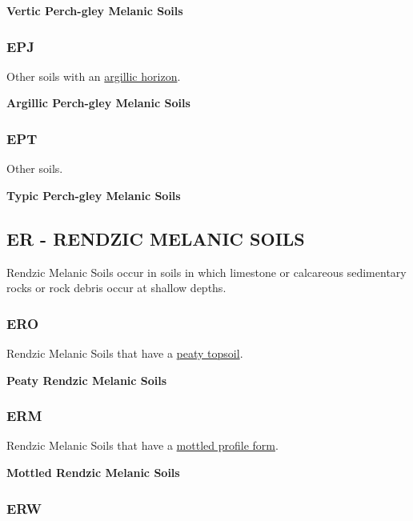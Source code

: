 \documentclass[
  letterpaper,
  DIV=11,
  numbers=noendperiod]{scrreprt}
\begin{document}
\textbf{Vertic Perch-gley Melanic Soils}

\hypertarget{sec-key-EPJ}{%
\subsubsection{\texorpdfstring{\textbf{EPJ}}{EPJ}}\label{sec-key-EPJ}}

Other soils with an \protect\hyperlink{sec-diag-argh}{argillic horizon}.

\textbf{Argillic Perch-gley Melanic Soils}

\hypertarget{sec-key-EPT}{%
\subsubsection{\texorpdfstring{\textbf{EPT}}{EPT}}\label{sec-key-EPT}}

Other soils.

\textbf{Typic Perch-gley Melanic Soils}

\hypertarget{sec-ER}{%
\subsection{\texorpdfstring{\textbf{ER} - RENDZIC MELANIC
SOILS}{ER - RENDZIC MELANIC SOILS}}\label{sec-ER}}

Rendzic Melanic Soils occur in soils in which limestone or calcareous
sedimentary rocks or rock debris occur at shallow depths.

\hypertarget{sec-key-ERO}{%
\subsubsection{\texorpdfstring{\textbf{ERO}}{ERO}}\label{sec-key-ERO}}

Rendzic Melanic Soils that have a \protect\hyperlink{sec-diag-pts}{peaty
topsoil}.

\textbf{Peaty Rendzic Melanic Soils}

\hypertarget{sec-key-ERM}{%
\subsubsection{\texorpdfstring{\textbf{ERM}}{ERM}}\label{sec-key-ERM}}

Rendzic Melanic Soils that have a
\protect\hyperlink{sec-diag-mottpf}{mottled profile form}.

\textbf{Mottled Rendzic Melanic Soils}

\hypertarget{sec-key-ERW}{%
\subsubsection{\texorpdfstring{\textbf{ERW}}{ERW}}\label{sec-key-ERW}}
\end{document}
